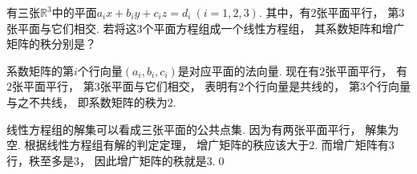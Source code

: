 \bigskip

\begin{example}
    有三张$\mathbb{R}^3$中的平面$a_{i}x + b_{i}y + c_i z = d_i~(i=1,2,3)$.
    其中，有$2$张平面平行，
    第$3$张平面与它们相交.
    若将这$3$个平面方程组成一个线性方程组，
    其系数矩阵和增广矩阵的秩分别是？
\end{example}
\smallskip
\begin{solution}
    系数矩阵的第$i$个行向量$(a_i,b_i,c_i)$是对应平面的法向量.
    现在有$2$张平面平行，
    有$2$张平面平行，
    第$3$张平面与它们相交，
    表明有$2$个行向量是共线的，
    第$3$个行向量与之不共线，
    即系数矩阵的秩为$2$.

    线性方程组的解集可以看成三张平面的公共点集.
    因为有两张平面平行，
    解集为空.
    根据线性方程组有解的判定定理，
    增广矩阵的秩应该大于$2$.
    而增广矩阵有$3$行，秩至多是$3$，
    因此增广矩阵的秩就是$3$.\qed
\end{solution}